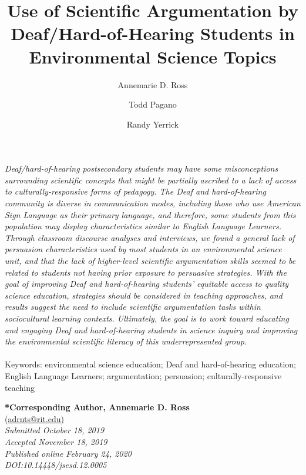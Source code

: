 \documentclass[11.5pt]{sig-alternate} %
\makeatletter
\let\oldabstract\abstract
\let\oldendabstract\endabstract
\renewenvironment{abstract}
{\renewenvironment{quotation}%
               {\list{}{\addtolength{\leftmargin}{1em} %
                        \listparindent 1.5em%
                        \itemindent    \listparindent%
                        \rightmargin   \leftmargin%
                        \parsep        \z@ \@plus\p@}%
                \item\relax}%
               {\endlist}%
\oldabstract}
{\oldendabstract}
\makeatother
\begin{document}
\title{Use of Scientific Argumentation by Deaf/Hard-of-Hearing Students in Environmental Science Topics}

\author[1]{\large \color{blue}Annemarie D. Ross}
\author[1]{\large \color{blue}Todd Pagano}
\author[2]{\large \color{blue}Randy Yerrick}

\toappear{}
\maketitle
\begin{@twocolumnfalse} 
\begin{abstract}
\item 
\textit {Deaf/hard-of-hearing postsecondary students may have some misconceptions surrounding scientific concepts that might be partially ascribed to a lack of access to culturally-responsive forms of pedagogy. The Deaf and hard-of-hearing community is diverse in communication modes, including those who use American Sign Language as their primary language, and therefore, some students from this population may display characteristics similar to English Language Learners. Through classroom discourse analyses and interviews, we found a general lack of persuasion characteristics used by most students in an environmental science unit, and that the lack of higher-level scientific argumentation skills seemed to be related to students not having prior exposure to persuasive strategies. With the goal of improving Deaf and hard-of-hearing students’ equitable access to quality science education, strategies should be considered in teaching approaches, and results suggest the need to include scientific argumentation tasks within sociocultural learning contexts. Ultimately, the goal is to work toward educating and engaging Deaf and hard-of-hearing students in science inquiry and improving the environmental scientific literacy of this underrepresented group.}
\\ \\
Keywords: environmental science education; Deaf and hard-of-hearing education; English Language Learners; argumentation; persuasion; culturally-responsive teaching
\end{abstract}
\end{@twocolumnfalse}


\textbf{*Corresponding Author, Annemarie D. Ross} \\
\href{mailto: adrnts@rit.edu }{(adrnts@rit.edu)} \\
\textit{Submitted  October 18, 2019} \\
\textit{Accepted November 18, 2019} \\
\textit{Published online February 24, 2020} \\
\textit{DOI:10.14448/jsesd.12.0005} \\
\pagebreak
\clearpage
\end{document}
